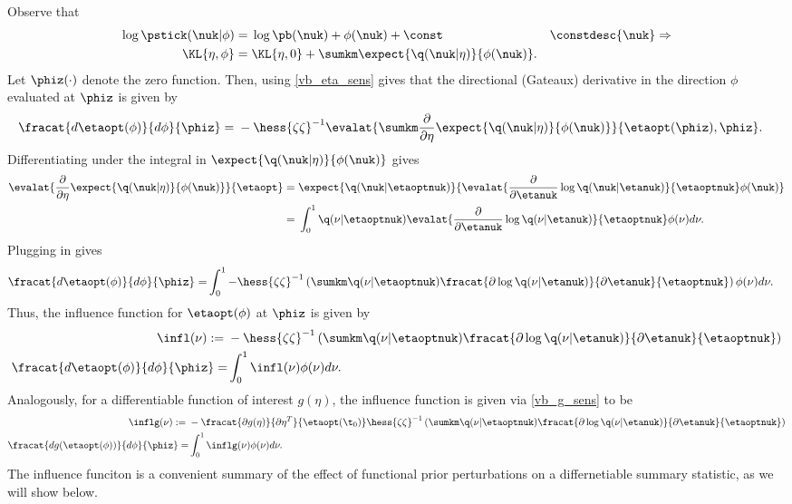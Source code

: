 Observe that
%
\begin{align*}
%
\log \pstick(\nuk \vert \phi) ={}&
    \log \pb(\nuk) + \phi(\nuk) + \const
    & \constdesc{\nuk} \Rightarrow\\
\KL{\eta, \phi} ={}&
    \KL{\eta, 0} + \sumkm \expect{\q(\nuk \vert \eta)}{\phi(\nuk)}.
%
\end{align*}
%
Let $\phiz(\cdot)$ denote the zero function.  Then, using \eqref{vb_eta_sens}
gives that the directional (Gateaux) derivative in the direction $\phi$
evaluated at $\phiz$ is given by
%
\begin{align*}
%
\fracat{d \etaopt(\phi)}{d \phi}{\phiz} ={}&
    - \hess{\zeta\zeta}^{-1}
    \evalat{
        \sumkm \frac{\partial}{\partial \eta}
            \expect{\q(\nuk \vert \eta)}{\phi(\nuk)}}
           {\etaopt(\phiz), \phiz}.
%
\end{align*}
%
Differentiating under the integral in $\expect{\q(\nuk \vert
\eta)}{\phi(\nuk)}$ gives
%
\begin{align*}
%
\evalat{
\frac{\partial}{\partial \eta}
    \expect{\q(\nuk \vert \eta)}{\phi(\nuk)}
}{\etaopt} ={}&
\expect{\q(\nuk \vert \etaoptnuk)}
       {\evalat{\frac{\partial}{\partial \etanuk}
                  \log\q(\nuk \vert \etanuk)}
                {\etaoptnuk}
        \phi(\nuk)} \\
={}&
\int_0^1
    \q(\nu \vert \etaoptnuk)
    \evalat{\frac{\partial}{\partial \etanuk}
               \log\q(\nu \vert \etanuk)}
             {\etaoptnuk}
    \phi(\nu) d\nu.
%
\end{align*}
%
Plugging in gives
%
\begin{align*}
%
\fracat{d \etaopt(\phi)}{d \phi}{\phiz} =&{}
    \int_0^1
    -\hess{\zeta\zeta}^{-1}
    \left(
        \sumkm
        \q(\nu \vert \etaoptnuk)
        \fracat{\partial \log\q(\nu \vert \etanuk)}
               {\partial \etanuk}
               {\etaoptnuk}
    \right) \phi(\nu) d\nu.
%
\end{align*}
%
Thus, the influence function for $\etaopt(\phi)$ at $\phiz$ is given by
%
\begin{align*}
%
\infl(\nu) :={}&
-\hess{\zeta\zeta}^{-1}
\left(
    \sumkm
    \q(\nu \vert \etaoptnuk)
    \fracat{\partial \log\q(\nu \vert \etanuk)}
           {\partial \etanuk}
           {\etaoptnuk}
\right) \\
\fracat{d \etaopt(\phi)}{d \phi}{\phiz} =&{}
    \int_0^1 \infl(\nu) \phi(\nu) d\nu.
%
\end{align*}
%
Analogously, for a differentiable function of interest $g(\eta)$,
the influence function is given via \eqref{vb_g_sens} to be
%
\begin{align*}
%
\inflg(\nu) :={}&
-\fracat{\partial g(\eta)}{\partial \eta^T}{\etaopt(\t_0)}
    \hess{\zeta\zeta}^{-1}
\left(
    \sumkm
    \q(\nu \vert \etaoptnuk)
    \fracat{\partial \log\q(\nu \vert \etanuk)}
           {\partial \etanuk}
           {\etaoptnuk}
\right) \\
\fracat{d g(\etaopt(\phi))}{d \phi}{\phiz} =&{}
    \int_0^1 \inflg(\nu) \phi(\nu) d\nu.
%
\end{align*}
%
The influence funciton is a convenient summary of the effect of functional prior
perturbations on a differnetiable summary statistic, as we will show below.

